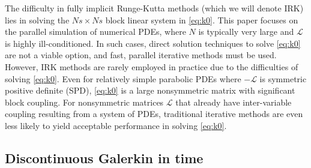 \documentclass[review]{siamart}
\begin{document}
The difficulty in fully implicit Runge-Kutta methods (which we will denote IRK) lies in
solving the $Ns\times Ns$ block linear system in \eqref{eq:k0}. This paper focuses on the
parallel simulation of numerical PDEs, where $N$ is typically very large
and $\mathcal{L}$ is highly ill-conditioned. In such cases, direct
solution techniques to solve \eqref{eq:k0} are not a viable option, and fast, parallel
iterative methods must be used. However, IRK methods are rarely employed in practice due
to the difficulties of solving \eqref{eq:k0}. Even for relatively simple
parabolic PDEs where $-\mathcal{L}$ is symmetric positive definite (SPD), \eqref{eq:k0}
is a large nonsymmetric matrix with significant block coupling. For nonsymmetric
matrices $\mathcal{L}$ that already have inter-variable coupling resulting from
a system of PDEs, traditional
iterative methods are even less likely to yield acceptable performance in solving
\eqref{eq:k0}.

\subsection{Discontinuous Galerkin in time}\label{sec:intro:dg}
\end{document}
